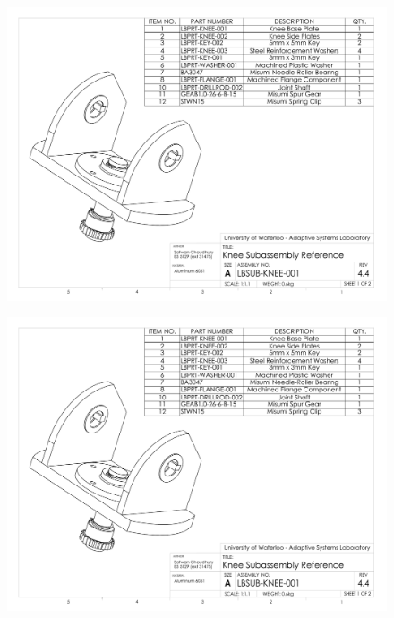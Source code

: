 \begin{figure}[!h]
	\begin{center}
    \includegraphics[scale=0.72,angle=90]{fig/drawings/lbsub-knee-001.pdf}
	\end{center}
\end{figure}

\begin{figure}[!h]
	\begin{center}
    \includegraphics[scale=0.72,angle=90,page=2]{fig/drawings/lbsub-knee-001.pdf}
	\end{center}
\end{figure}

